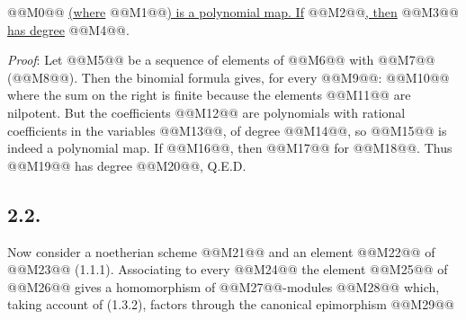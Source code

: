 
@@M0@@
\uline{(where} @@M1@@\uline{) is a polynomial map. If} @@M2@@\uline{, then} @@M3@@ \uline{has degree} @@M4@@.

\emph{Proof}: Let @@M5@@ be a sequence of elements of @@M6@@ with @@M7@@ (@@M8@@). Then the binomial formula gives, for every @@M9@@:
@@M10@@
where the sum on the right is finite because the elements @@M11@@ are nilpotent. But the coefficients @@M12@@ are polynomials with rational coefficients in the variables @@M13@@, of degree @@M14@@, so @@M15@@ is indeed a polynomial map. If @@M16@@, then @@M17@@ for @@M18@@. Thus @@M19@@ has degree @@M20@@, Q.E.D.

\subsection*{2.2.}
Now consider a noetherian scheme @@M21@@ and an element @@M22@@ of @@M23@@ (1.1.1). Associating to every @@M24@@ the element @@M25@@ of @@M26@@ gives a homomorphism of @@M27@@-modules
@@M28@@
which, taking account of (1.3.2), factors through the canonical epimorphism
@@M29@@

